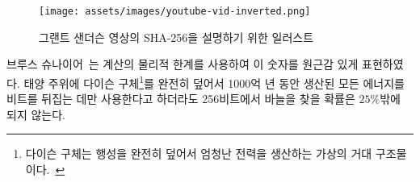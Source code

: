 \begin{comment}
	\begin{figure}
		\texttt{[image: assets/images/youtube-vid-inverted.png]}
		\caption{Illustration of SHA-256 security. Original graphic by Grant Sanderson aka 3Blue1Brown.}
		\label{fig:youtube-vid-inverted}
	\end{figure}
\end{comment}
\begin{figure}
	\texttt{[image: assets/images/youtube-vid-inverted.png]}
	\caption{그랜트 샌더슨 영상의 SHA-256을 설명하기 위한 일러스트}
	\label{fig:youtube-vid-inverted}
\end{figure}

\begin{comment}
	Bruce Schneier~\cite{web:schneier} used the physical limits of computation to put this
	number into perspective: even if we could build an optimal computer,
	which would use any provided energy to flip bits perfectly~\cite{wiki:landauer}, build a
	Dyson sphere\footnote{A Dyson sphere is a hypothetical megastructure that completely encompasses a star and captures a large percentage of its power output.~\cite{wiki:dyson}} around our sun, and let it run for 100 billion billion
	years, we would still only have a $25\%$ chance to find a needle in a
	256-bit haystack.
\end{comment}
브루스 슈나이어~\cite{web:schneier}는 계산의 물리적 한계를 사용하여 이 숫자를 원근감 있게 표현하였다.
태양 주위에 다이슨 구체\footnote{다이슨 구체는 행성을 완전히 덮어서 엄청난 전력을 생산하는 가상의 거대 구조물이다.~\cite{wiki:dyson}}를 완전히 덮어서 1000억 년 동안 생산된 모든 에너지를 비트를 뒤집는 데만 사용한다고 하더라도 256비트에서 바늘을 찾을 확률은 $25\%$밖에 되지 않는다.


